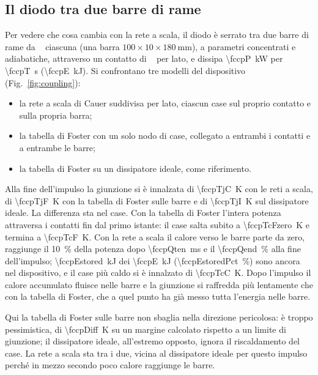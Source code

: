 \documentclass[10pt,a4paper]{scrartcl}
\let\newcommand\fcitdefine
\newcommand{\KkW}{\si{\kelvin\per\kilo\watt}}
\newcommand{\JK}{\si{\joule\per\kelvin}}
\begin{document}
\subsection{Il diodo tra due barre di rame}
\label{sec:onbars}
Per vedere che cosa cambia con la rete a scala, il diodo è serrato tra due barre di rame da \fccpCbar~\JK{} ciascuna (una barra $100 \times 10 \times \SI{180}{\milli\metre}$), a parametri concentrati e adiabatiche, attraverso un contatto di \fccpRch~\KkW{} per lato, e dissipa \SI{\fccpP}{\kilo\watt} per \SI{\fccpT}{\second} (\SI{\fccpE}{\kilo\joule}). Si confrontano tre modelli del dispositivo (Fig.~\ref{fig:coupling}):
\begin{itemize}
\item la rete a scala di Cauer suddivisa per lato, ciascun case sul proprio contatto e sulla propria barra;
\item la tabella di Foster con un solo nodo di case, collegato a entrambi i contatti e a entrambe le barre;
\item la tabella di Foster su un dissipatore ideale, come riferimento.
\end{itemize}
Alla fine dell'impulso la giunzione si è innalzata di \SI{\fccpTjC}{\kelvin} con le reti a scala, di \SI{\fccpTjF}{\kelvin} con la tabella di Foster sulle barre e di \SI{\fccpTjI}{\kelvin} sul dissipatore ideale. La differenza sta nel case. Con la tabella di Foster l'intera potenza attraversa i contatti fin dal primo istante: il case salta subito a \SI{\fccpTcFzero}{\kelvin} e termina a \SI{\fccpTcF}{\kelvin}. Con la rete a scala il calore verso le barre parte da zero, raggiunge il \SI{10}{\percent} della potenza dopo \SI{\fccpQten}{\milli\second} e il \SI{\fccpQend}{\percent} alla fine dell'impulso; \SI{\fccpEstored}{\kilo\joule} dei \SI{\fccpE}{\kilo\joule} (\SI{\fccpEstoredPct}{\percent}) sono ancora nel dispositivo, e il case più caldo si è innalzato di \SI{\fccpTcC}{\kelvin}. Dopo l'impulso il calore accumulato fluisce nelle barre e la giunzione si raffredda più lentamente che con la tabella di Foster, che a quel punto ha già messo tutta l'energia nelle barre.

Qui la tabella di Foster sulle barre non sbaglia nella direzione pericolosa: è troppo pessimistica, di \SI{\fccpDiff}{\kelvin} su un margine calcolato rispetto a un limite di giunzione; il dissipatore ideale, all'estremo opposto, ignora il riscaldamento del case. La rete a scala sta tra i due, vicina al dissipatore ideale per questo impulso perché in mezzo secondo poco calore raggiunge le barre.
\end{document}
